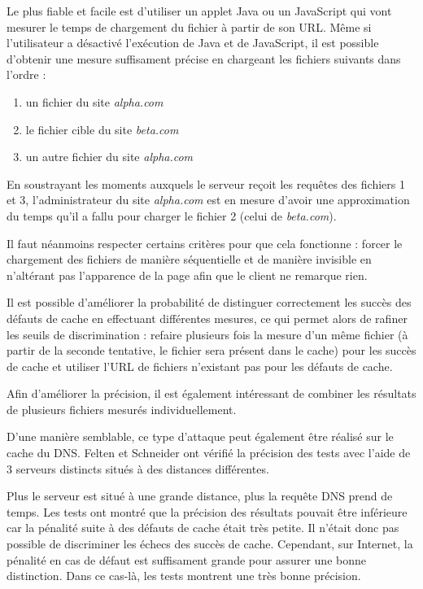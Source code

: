 Le plus fiable et facile est d'utiliser un applet Java ou un JavaScript qui vont mesurer le temps de chargement du fichier à partir de son URL. Même si l'utilisateur a désactivé l'exécution de Java et de JavaScript, il est possible d'obtenir une mesure suffisament précise en chargeant les fichiers suivants dans l'ordre :

\begin{enumerate}
  \item un fichier du site \emph{alpha.com}
  \item le fichier cible du site \emph{beta.com}
  \item un autre fichier du site \emph{alpha.com}
\end{enumerate}

En soustrayant les moments auxquels le serveur reçoit les requêtes des fichiers 1 et 3, l'administrateur du site \emph{alpha.com} est en mesure d'avoir une approximation du temps qu'il a fallu pour charger le fichier 2 (celui de \emph{beta.com}).

Il faut néanmoins respecter certains critères pour que cela fonctionne : forcer le chargement des fichiers de manière séquentielle et de manière invisible en n'altérant pas l'apparence de la page afin que le client ne remarque rien.
\newline

Il est possible d'améliorer la probabilité de distinguer correctement les succès des défauts de cache en effectuant différentes mesures, ce qui permet alors de rafiner les seuils de discrimination : refaire plusieurs fois la mesure d'un même fichier (à partir de la seconde tentative, le fichier sera présent dans le cache) pour les succès de cache et utiliser l'URL de fichiers n'existant pas pour les défauts de cache.

Afin d'améliorer la précision, il est également intéressant de combiner les résultats de plusieurs fichiers mesurés individuellement.
\newline

D'une manière semblable, ce type d'attaque peut également être réalisé sur le cache du DNS. Felten et Schneider ont vérifié la précision des tests avec l'aide de 3 serveurs distincts situés à des distances différentes.

Plus le serveur est situé à une grande distance, plus la requête DNS prend de temps. Les tests ont montré que la précision des résultats pouvait être inférieure car la pénalité suite à des défauts de cache était très petite. Il n'était donc pas possible de discriminer les échecs des succès de cache. Cependant, sur Internet, la pénalité en cas de défaut est suffisament grande pour assurer une bonne distinction. Dans ce cas-là, les tests montrent une très bonne précision.
\newline

